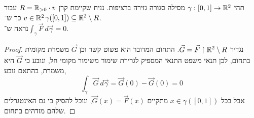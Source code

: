 \subquestion{}
תהי $\gamma : [0, 1] \to \mathbb{R}^2$ מסילה סגורה גזירה ברציפות.
נניח שקיימת קרן $R = \mathbb{R}_{>0} \cdot v$ עבור $v \in \mathbb{R}^2$ כך ש־$\gamma([0, 1]) \subseteq \mathbb{R}^2 \setminus R$. \\
נראה ש־$\int_\gamma \vec{F}\ d\vec{\gamma} = 0$.
\begin{proof}
	נגדיר $\vec{G} = \vec{F} \restriction \mathbb{R}^2 \setminus R$.
	התחום המדובר הוא פשוט קשר וכן $\vec{G}$ משמרת מקומית בתחום, לכן תנאי משפט התנאי המספיק לגרירת שימור משימור מקומי חל, ונובע כי $\vec{G}$ היא משמרת, בהתאם נובע,
	\[
		\int_\gamma \vec{G}\ d\vec{\gamma}
		= \vec{G}(0) - \vec{G}(0)
		= 0
	\]
	אבל בכל $x \in \gamma([0, 1])$ מתקיים $\vec{G}(x) = \vec{F}(x)$, ונוכל להסיק כי גם האינטגרלים שלהם מזדהים בתחום.
\end{proof}


